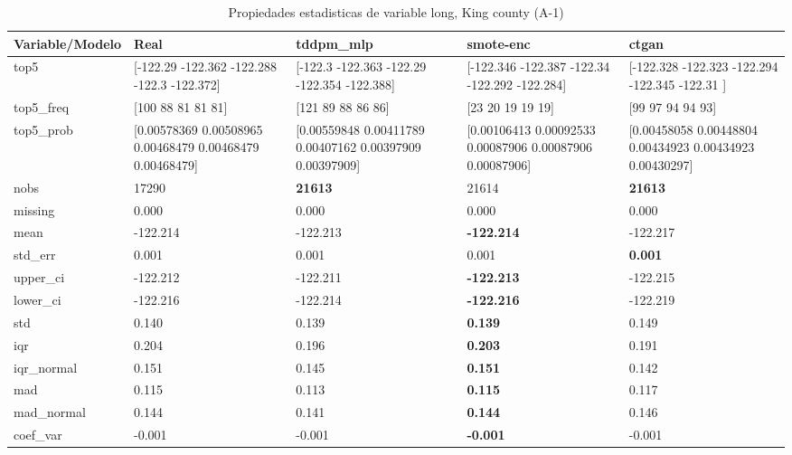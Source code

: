 \begin{table}[H]
\centering
\fontsize{8}{14}\selectfont
\caption{Propiedades  estadisticas de variable long, King county (A-1)}
\label{table-stats-king county-a-1-long}
\begin{tabular}{|l|m{10em}|m{10em}|m{10em}|m{10em}|}
\hline
 \rowcolor[gray]{0.8}
Variable/Modelo & Real & tddpm\_mlp & smote-enc & ctgan \\
\hline top5 & [-122.29  -122.362 -122.288 -122.3   -122.372] & [-122.3   -122.363 -122.29  -122.354 -122.388] & [-122.346 -122.387 -122.34  -122.292 -122.284] & [-122.328 -122.323 -122.294 -122.345 -122.31 ] \\
\hline top5\_freq & [100  88  81  81  81] & [121  89  88  86  86] & [23 20 19 19 19] & [99 97 94 94 93] \\
\hline top5\_prob & [0.00578369 0.00508965 0.00468479 0.00468479 0.00468479] & [0.00559848 0.00411789 0.00407162 0.00397909 0.00397909] & [0.00106413 0.00092533 0.00087906 0.00087906 0.00087906] & [0.00458058 0.00448804 0.00434923 0.00434923 0.00430297] \\
\hline nobs & 17290 & \bfseries 21613 & \cellcolor[rgb]{0.9, 0.54, 0.52} 21614 & \bfseries 21613 \\
\hline missing & 0.000 & 0.000 & 0.000 & 0.000 \\
\hline mean & -122.214 & -122.213 & \bfseries -122.214 & \cellcolor[rgb]{0.9, 0.54, 0.52} -122.217 \\
\hline std\_err & 0.001 & \cellcolor[rgb]{0.9, 0.54, 0.52} 0.001 & 0.001 & \bfseries 0.001 \\
\hline upper\_ci & -122.212 & -122.211 & \bfseries -122.213 & \cellcolor[rgb]{0.9, 0.54, 0.52} -122.215 \\
\hline lower\_ci & -122.216 & -122.214 & \bfseries -122.216 & \cellcolor[rgb]{0.9, 0.54, 0.52} -122.219 \\
\hline std & 0.140 & 0.139 & \bfseries 0.139 & \cellcolor[rgb]{0.9, 0.54, 0.52} 0.149 \\
\hline iqr & 0.204 & 0.196 & \bfseries 0.203 & \cellcolor[rgb]{0.9, 0.54, 0.52} 0.191 \\
\hline iqr\_normal & 0.151 & 0.145 & \bfseries 0.151 & \cellcolor[rgb]{0.9, 0.54, 0.52} 0.142 \\
\hline mad & 0.115 & \cellcolor[rgb]{0.9, 0.54, 0.52} 0.113 & \bfseries 0.115 & 0.117 \\
\hline mad\_normal & 0.144 & \cellcolor[rgb]{0.9, 0.54, 0.52} 0.141 & \bfseries 0.144 & 0.146 \\
\hline coef\_var & -0.001 & -0.001 & \bfseries -0.001 & \cellcolor[rgb]{0.9, 0.54, 0.52} -0.001 \\

\end{tabular}
\end{table}
